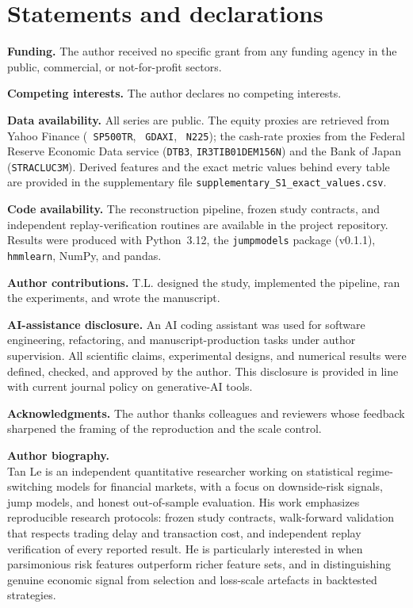 \documentclass[11pt]{article}
\begin{document}
\ifanon\else
\section*{Statements and declarations}
\small
\textbf{Funding.} The author received no specific grant from any funding agency
in the public, commercial, or not-for-profit sectors.

\textbf{Competing interests.} The author declares no competing interests.

\textbf{Data availability.} All series are public. The equity proxies are
retrieved from Yahoo Finance (\texttt{ SP500TR}, \texttt{ GDAXI},
\texttt{ N225}); the cash-rate proxies from the Federal Reserve Economic
Data service (\texttt{DTB3}, \texttt{IR3TIB01DEM156N}) and the Bank of Japan
(\texttt{STRACLUC3M}). Derived features and the exact metric values behind every
table are provided in the supplementary file
\texttt{supplementary\_S1\_exact\_values.csv}.

\textbf{Code availability.} The reconstruction pipeline, frozen study contracts,
and independent replay-verification routines are available in the project
repository. Results were produced with Python~3.12, the \texttt{jumpmodels}
package (v0.1.1), \texttt{hmmlearn}, NumPy, and pandas.

\textbf{Author contributions.} T.L. designed the study, implemented the
pipeline, ran the experiments, and wrote the manuscript.

\textbf{AI-assistance disclosure.} An AI coding assistant was used for software
engineering, refactoring, and manuscript-production tasks under author
supervision. All scientific claims, experimental designs, and numerical results
were defined, checked, and approved by the author. This disclosure is provided in
line with current journal policy on generative-AI tools.

\textbf{Acknowledgments.} The author thanks colleagues and reviewers whose
feedback sharpened the framing of the reproduction and the scale control.

\bigskip
\noindent\textbf{Author biography.}\\
Tan Le is an independent quantitative researcher working on statistical
regime-switching models for financial markets, with a focus on downside-risk
signals, jump models, and honest out-of-sample evaluation. His work emphasizes
reproducible research protocols: frozen study contracts, walk-forward validation
that respects trading delay and transaction cost, and independent replay
verification of every reported result. He is particularly interested in when
parsimonious risk features outperform richer feature sets, and in distinguishing
genuine economic signal from selection and loss-scale artefacts in backtested
strategies.
\fi
\end{document}
